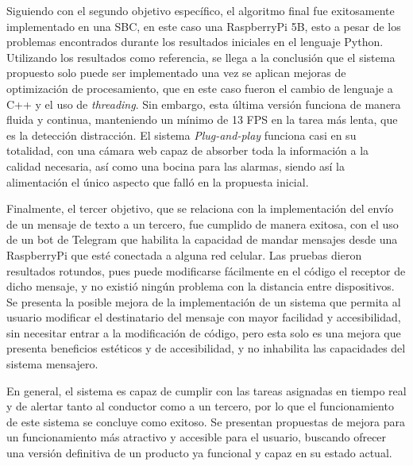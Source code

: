 Siguiendo con el segundo objetivo específico, el algoritmo final fue exitosamente implementado en una SBC, en este caso una RaspberryPi 5B, esto a pesar de los problemas encontrados durante los resultados iniciales en el lenguaje Python. Utilizando los resultados como referencia, se llega a la conclusión que el sistema propuesto solo puede ser implementado una vez se aplican mejoras de optimización de procesamiento, que en este caso fueron el cambio de lenguaje a C++ y el uso de \textit{threading}. Sin embargo, esta última versión funciona de manera fluida y continua, manteniendo un mínimo de 13 FPS en la tarea más lenta, que es la detección distracción. El sistema \textit{Plug-and-play} funciona casi en su totalidad, con una cámara web capaz de absorber toda la información a la calidad necesaria, así como una bocina para las alarmas, siendo así la alimentación el único aspecto que falló en la propuesta inicial. 

Finalmente, el tercer objetivo, que se relaciona con la implementación del envío de un mensaje de texto a un tercero, fue cumplido de manera exitosa, con el uso de un bot de Telegram que habilita la capacidad de mandar mensajes desde una RaspberryPi que esté conectada a alguna red celular. Las pruebas dieron resultados rotundos, pues puede modificarse fácilmente en el código el receptor de dicho mensaje, y no existió ningún problema con la distancia entre dispositivos. Se presenta la posible mejora de la implementación de un sistema que permita al usuario modificar el destinatario del mensaje con mayor facilidad y accesibilidad, sin necesitar entrar a la modificación de código, pero esta solo es una mejora que presenta beneficios estéticos y de accesibilidad, y no inhabilita las capacidades del sistema mensajero.

En general, el sistema es capaz de cumplir con las tareas asignadas en tiempo real y de alertar tanto al conductor como a un tercero, por lo que el funcionamiento de este sistema se concluye como exitoso. Se presentan propuestas de mejora para un funcionamiento más atractivo y accesible para el usuario, buscando ofrecer una versión definitiva de un producto ya funcional y capaz en su estado actual. 
